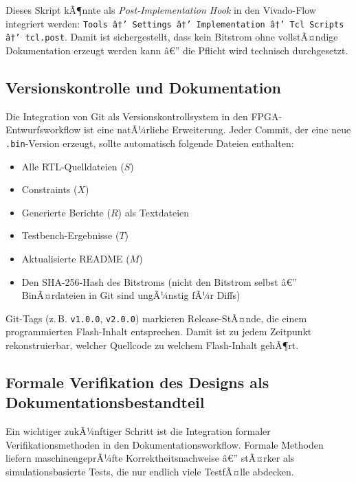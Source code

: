 ﻿\documentclass[a4paper,12pt]{article}
\theoremstyle{definition}
\begin{document}
Dieses Skript kÃ¶nnte als \emph{Post-Implementation Hook} in den Vivado-Flow
integriert werden: \texttt{Tools â†’ Settings â†’ Implementation â†’ Tcl Scripts
â†’ tcl.post}. Damit ist sichergestellt, dass kein Bitstrom ohne vollstÃ¤ndige
Dokumentation erzeugt werden kann â€” die Pflicht wird technisch durchgesetzt.

\subsection{Versionskontrolle und Dokumentation}

Die Integration von Git als Versionskontrollsystem in den FPGA-Entwurfsworkflow
ist eine natÃ¼rliche Erweiterung. Jeder Commit, der eine neue \texttt{.bin}-Version
erzeugt, sollte automatisch folgende Dateien enthalten:
\begin{itemize}
    \item Alle RTL-Quelldateien ($S$)
    \item Constraints ($X$)
    \item Generierte Berichte ($R$) als Textdateien
    \item Testbench-Ergebnisse ($T$)
    \item Aktualisierte README ($M$)
    \item Den SHA-256-Hash des Bitstroms (nicht den Bitstrom selbst â€”
          BinÃ¤rdateien in Git sind ungÃ¼nstig fÃ¼r Diffs)
\end{itemize}

Git-Tags (z.\,B. \texttt{v1.0.0}, \texttt{v2.0.0}) markieren
Release-StÃ¤nde, die einem programmierten Flash-Inhalt entsprechen.
Damit ist zu jedem Zeitpunkt rekonstruierbar, welcher Quellcode zu
welchem Flash-Inhalt gehÃ¶rt.

\subsection{Formale Verifikation des Designs als Dokumentationsbestandteil}

Ein wichtiger zukÃ¼nftiger Schritt ist die Integration formaler
Verifikationsmethoden in den Dokumentationsworkflow. Formale Methoden
liefern maschinengeprÃ¼fte Korrektheitsnachweise â€” stÃ¤rker als
simulationsbasierte Tests, die nur endlich viele TestfÃ¤lle abdecken.
\end{document}
